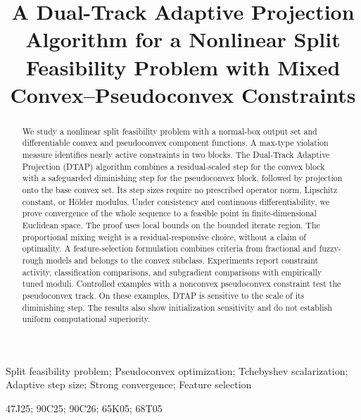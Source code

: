 \documentclass[]{interact}
\theoremstyle{plain}
\theoremstyle{definition}
\theoremstyle{remark}
\newcommand{\dtap}{\textsc{DTAP}}
\begin{document}
\title{A Dual-Track Adaptive Projection Algorithm for a Nonlinear Split Feasibility Problem with Mixed Convex--Pseudoconvex Constraints}

\author{
}

\maketitle

\begin{abstract}
We study a nonlinear split feasibility problem with a normal-box output set and differentiable convex and pseudoconvex component functions. A max-type violation measure identifies nearly active constraints in two blocks. The Dual-Track Adaptive Projection (\dtap) algorithm combines a residual-scaled step for the convex block with a safeguarded diminishing step for the pseudoconvex block, followed by projection onto the base convex set. Its step sizes require no prescribed operator norm, Lipschitz constant, or H\"older modulus. Under consistency and continuous differentiability, we prove convergence of the whole sequence to a feasible point in finite-dimensional Euclidean space. The proof uses local bounds on the bounded iterate region. The proportional mixing weight is a residual-responsive choice, without a claim of optimality. A feature-selection formulation combines criteria from fractional and fuzzy-rough models and belongs to the convex subclass. Experiments report constraint activity, classification comparisons, and subgradient comparisons with empirically tuned moduli. Controlled examples with a nonconvex pseudoconvex constraint test the pseudoconvex track. On these examples, DTAP is sensitive to the scale of its diminishing step. The results also show initialization sensitivity and do not establish uniform computational superiority.
\end{abstract}

\begin{keywords}
Split feasibility problem; Pseudoconvex optimization; Tchebyshev scalarization; Adaptive step size; Strong convergence; Feature selection
\end{keywords}
\begin{amscode}
47J25; 90C25; 90C26; 65K05; 68T05
\end{amscode}
\end{document}
